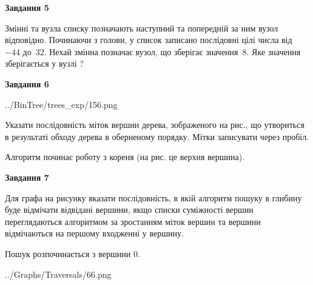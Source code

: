 \documentclass[12pt, ukrainian]{article}
\begin{document}
{\begin {large}
{\begin {center}\textbf{Завдання 5}\end {center}}\par
Змінні  та  вузла списку позначають наступний та попередній за ним вузол відповідно. Починаючи з голови, у список записано послідовні цілі числа від~$-44$ до~$32$. Нехай змінна  позначає вузол, що зберігає значення~$8$.
Яке значення зберігається у вузлі  ?\par
\newpage

{\begin {center}\textbf{Завдання 6}\end {center}}\par

\begin{center}
	{../BinTree/trees_exp/156.png}
\end{center}
Указати послідовність міток вершин дерева, зображеного на рис., що утвориться в результаті обходу дерева в оберненому порядку. Мітки записувати через пробіл.\par Алгоритм починає роботу з кореня (на рис. це верхня вершина).\par
\newpage

{\begin {center}\textbf{Завдання 7}\end {center}}\par
Для графа на рисунку вказати послідовність, в якій алгоритм пошуку в глибину буде відмічати відвідані вершини, якщо списки суміжності вершин переглядаються алгоритмом за зростанням міток вершин та вершини відмічаються на першому вход\-женні у вершину.\par
Пошук розпочинається з вершини 0.\par

\begin{center}
	{../Graphs/Traversals/66.png}
\end{center}\par
\newpage


\end{large}}
\end{document}
